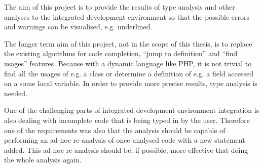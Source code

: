     The aim of this project is to provide the results of type analysis 
    and other analyses to the integrated development environment so 
    that the possible errors and warnings can be visualised, e.g. underlined.
    
    The longer term aim of this project, not in the scope of this thesis, 
    is to replace the existing algorithms for code completion, 
    ``jump to definition'' and ``find usages'' features. Because 
    with a dynamic language like PHP, it is not trivial to 
    find all the usages of e.g. a class or determine 
    a definition of e.g. a field accessed on a some local variable. 
    In order to provide more precise results, 
    type analysis is needed.
    
    One of the challenging parts of integrated development 
    environment integration is also dealing with incomplete code 
    that is being typed in by the user. Therefore one of the requirements 
    was also that the analysis should be capable of 
    performing an ad-hoc re-analysis of once analysed 
    code with a new statement added. This ad-hoc re-analysis 
    should be, if possible, more effective that doing the 
    whole analysis again.
    
